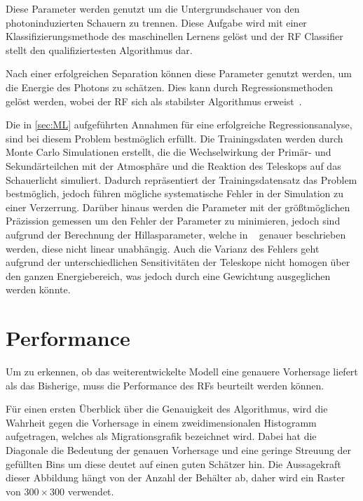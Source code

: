 Diese Parameter werden genutzt um die Untergrundschauer von den photoninduzierten Schauern zu trennen.
Diese Aufgabe wird mit einer Klassifizierungsmethode des maschinellen Lernens gelöst und der
RF Classifier stellt den qualifiziertesten Algorithmus dar.

Nach einer erfolgreichen Separation können diese Parameter genutzt werden, um die Energie des Photons zu schätzen.
Dies kann durch Regressionsmethoden gelöst werden, wobei der RF sich als stabilster Algorithmus erweist~\cite{Cherenkov_Licht}.

Die in \autoref{sec:ML} aufgeführten Annahmen für eine erfolgreiche Regressionsanalyse, sind bei diesem Problem bestmöglich erfüllt. Die Trainingsdaten
werden durch Monte Carlo Simulationen erstellt, die die Wechselwirkung der Primär- und Sekundärteilchen mit der Atmosphäre und die Reaktion des Teleskops
auf das Schauerlicht simuliert.
Dadurch repräsentiert der Trainingsdatensatz das Problem bestmöglich, jedoch führen mögliche systematische Fehler in der Simulation zu einer Verzerrung.
Darüber hinaus werden die Parameter mit der größtmöglichen Präzission gemessen um den Fehler der Parameter zu minimieren,
jedoch sind aufgrund der Berechnung der Hillasparameter, welche in ~\cite[102]{HESS}
genauer beschrieben werden, diese nicht linear unabhängig.
Auch die Varianz des Fehlers geht aufgrund der unterschiedlichen Sensitivitäten der Teleskope nicht homogen
über den ganzen Energiebereich, was jedoch durch eine Gewichtung ausgeglichen werden könnte.

\section{Performance}
\label{sec:Per}

Um zu erkennen, ob das weiterentwickelte Modell eine genauere Vorhersage liefert als das Bisherige, muss die
Performance des RFs beurteilt werden können.

Für einen ersten Überblick über die Genauigkeit des Algorithmus, wird die Wahrheit gegen die Vorhersage in einem
zweidimensionalen Histogramm aufgetragen, welches als Migrationsgrafik bezeichnet wird.
Dabei hat die Diagonale die Bedeutung der genauen Vorhersage und eine geringe Streuung der gefüllten Bins
um diese deutet auf einen guten Schätzer hin.
Die Aussagekraft dieser Abbildung hängt von der Anzahl der Behälter ab, daher wird ein Raster von $300 \times 300$ verwendet.

